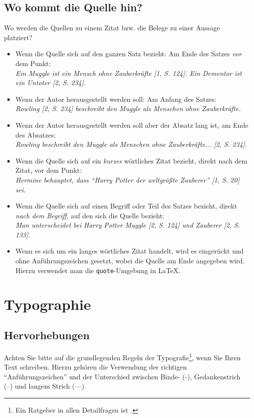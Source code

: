 \documentclass[conference,compsoc,final,a4paper]{IEEEtran}
\begin{document}
    \subsection{Wo kommt die Quelle hin?}
    Wo werden die Quellen zu einem Zitat bzw. die Belege zu einer Aussage platziert?

    \begin{itemize}
        \item Wenn die Quelle sich auf den ganzen Satz bezieht: Am Ende des Satzes \textit{vor} dem Punkt:\\ \textit{Ein Muggle ist ein Mensch ohne Zauberkräfte [1, S. 124]. Ein Dementor ist ein Untoter [2, S. 234].}
        \item Wenn der Autor herausgestellt werden soll: Am Anfang des Satzes:\\ \textit{Rowling [2, S. 234] beschreibt den Muggle als Menschen ohne Zauberkräfte.}
        \item Wenn der Autor herausgestellt werden soll aber der Absatz lang ist, am Ende des Absatzes:\\ \textit{Rowling beschreibt den Muggle als Menschen ohne Zauberkräfte... [2, S. 234].}
        \item Wenn die Quelle sich auf ein \textit{kurzes} wörtliches Zitat bezieht, direkt nach dem Zitat, vor dem Punkt:\\ \textit{Hermine behauptet, dass \enquote{Harry Potter der weltgrößte Zauberer} [1, S. 20] sei.}
        \item Wenn die Quelle sich auf einen Begriff oder Teil des Satzes bezieht, direkt \textit{nach dem Begriff}, auf den sich die Quelle bezieht:\\ \textit{Man unterscheidet bei Harry Potter Muggle [2, S. 124] und Zauberer [2, S. 133].}
        \item Wenn es sich um ein langes wörtliches Zitat handelt, wird es eingerückt und ohne Anführungszeichen gesetzt, wobei die Quelle am Ende angegeben wird. Hierzu verwendet man die \texttt{quote}-Umgebung in \LaTeX.
    \end{itemize}



    \section{Typographie}

    \subsection{Hervorhebungen}\label{Einleitung:Textauszeichnungen}
    Achten Sie bitte auf die grundlegenden Regeln der Typografie\footnote{Ein Ratgeber in allen Detailfragen ist \cite{Forssman2002}.}, wenn Sie Ihren Text schreiben. Hierzu gehören \zb{} die Verwendung der richtigen "`Anführungszeichen"' und der Unterschied zwischen Binde- (-), Gedankenstrich (--) und langem Strich (---).
\end{document}
